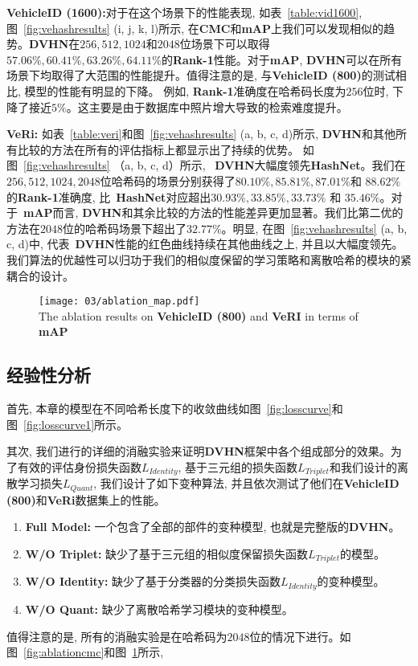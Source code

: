 \textbf{VehicleID (1600):}对于在这个场景下的性能表现, 如表~\ref{table:vid1600}, 图~\ref{fig:vehashresults} (i, j, k, l)所示, 在\textbf{CMC}和\textbf{mAP}上我们可以发现相似的趋势。\textbf{DVHN}在$256, 512, 1024$和$2048$位场景下可以取得$57.06\%, 60.41\%, 63.26\%,64.11\%$的\textbf{Rank-1}性能。对于\textbf{mAP}, \textbf{DVHN}可以在所有场景下均取得了大范围的性能提升。值得注意的是, 与\textbf{VehicleID (800)}的测试相比, 模型的性能有明显的下降。 例如, \textbf{Rank-1}准确度在哈希码长度为$256$位时, 下降了接近$5 \%$。这主要是由于数据库中照片增大导致的检索难度提升。 \par
\textbf{VeRi: }如表~\ref{table:veri}和图~\ref{fig:vehashresults} (a, b, c, d)所示, \textbf{DVHN}和其他所有比较的方法在所有的评估指标上都显示出了持续的优势。 如图~\ref{fig:vehashresults} （a, b, c, d）所示, ~\textbf{DVHN}大幅度领先\textbf{HashNet}。我们在$256,512,1024,2048$位哈希码的场景分别获得了$80.10\%, 85.81\%, 87.01\% $和 $88.62\%$的\textbf{Rank-1}准确度, 比~\textbf{HashNet}对应超出$30.93\%, 33.85\%, 33.73\%$ 和 $35.46\%$。对于~\textbf{mAP}而言, \textbf{DVHN}和其余比较的方法的性能差异更加显著。我们比第二优的方法在$2048$位的哈希码场景下超出了$32.77 \%$。明显, 在图~\ref{fig:vehashresults} (a, b, c, d)中, 代表~\textbf{DVHN}性能的红色曲线持续在其他曲线之上, 并且以大幅度领先。我们算法的优越性可以归功于我们的相似度保留的学习策略和离散哈希的模块的紧耦合的设计。

\begin{figure}[!htp]
    \centering
    \texttt{[image: 03/ablation\_map.pdf]} \\
      {The ablation results on \textbf{VehicleID (800)} and \textbf{VeRI} in terms of \textbf{mAP}}
   \label{fig:ablationmap}
\end{figure}

\subsection{经验性分析}
首先, 本章的模型在不同哈希长度下的收敛曲线如图~\ref{fig:losscurve}和图~\ref{fig:losscurve1}所示。\par
其次, 我们进行的详细的消融实验来证明\textbf{DVHN}框架中各个组成部分的效果。为了有效的评估身份损失函数$L_{Identity}$, 基于三元组的损失函数$L_{Triplet}$和我们设计的离散学习损失$L_{Quant}$, 我们设计了如下变种算法, 并且依次测试了他们在\textbf{VehicleID (800)}和\textbf{VeRi}数据集上的性能。
\begin{enumerate}
    \item \textbf{Full Model:} 一个包含了全部的部件的变种模型, 也就是完整版的\textbf{DVHN}。
    \item \textbf{W/O Triplet:} 缺少了基于三元组的相似度保留损失函数$L_{Triplet}$的模型。 
    \item  \textbf{W/O Identity:} 缺少了基于分类器的分类损失函数$L_{Identity}$的变种模型。
    \item \textbf{W/O Quant:} 缺少了离散哈希学习模块的变种模型。
\end{enumerate}
值得注意的是, 所有的消融实验是在哈希码为$2048$位的情况下进行。如图~\ref{fig:ablationcmc}和图~\ref{fig:ablationmap}所示, 

